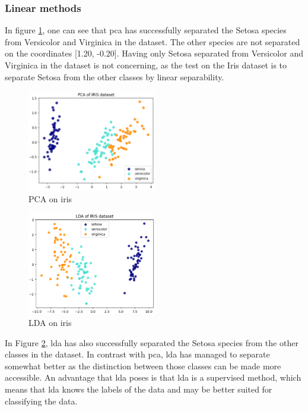 \subsubsection{Linear methods}\label{subsubsec:linear-methods-on-iris}
In figure \ref{fig:iris-pca}, one can see that \gls{pca} has successfully separated the Setosa species from Versicolor and Virginica in the dataset. The other species are not separated on the coordinates [1.20, -0.20]. Having only Setosa separated from Versicolor and Virginica in the dataset is not concerning, as the test on the Iris dataset is to separate Setosa from the other classes by linear separability. 

\begin{figure}[htb!]
\centering
\includegraphics[width=0.5\textwidth]{figures/theory-example-figures/iris-pca.png}
\caption{PCA on iris}
\label{fig:iris-pca}
\end{figure}


\begin{figure}[htb!]
    \centering
    \includegraphics[width=0.5\textwidth]{figures/theory-example-figures/iris-lda.png}
    \caption{LDA on iris}
    \label{fig:iris-lda}
    \end{figure}
    
In Figure \ref{fig:iris-lda}, \gls{lda} has also successfully separated the Setosa species from the other classes in the dataset. In contrast with \gls{pca}, \gls{lda} has managed to separate somewhat better as the distinction between those classes can be made more accessible. An advantage that \gls{lda} poses is that \gls{lda} is a supervised method, which means that  \gls{lda} knows the labels of the data and may be better suited for classifying the data.


